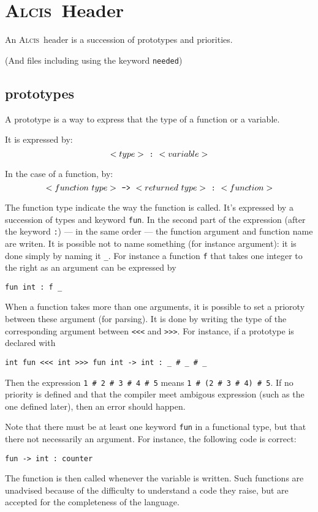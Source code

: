 \documentclass{article}
\newcommand{\Alcis}{\textsc{Alcis}~}
\begin{document}
\section{\Alcis Header}

An \Alcis header is a succession of prototypes and priorities.

(And files including using the keyword \texttt{needed})

\subsection{prototypes}

A prototype is a way to express that the type of a function or a variable.

It is expressed by:
\[
    <type>~\textrm{\tt:}~<variable>
\]

In the case of a function, by:
\[
    <function~type>~\textrm{\tt->}~<returned~type>~\textrm{\tt:}~<function>
\]

The function type indicate the way the function is called.
It’s expressed by a succession of types and keyword \lstinline$fun$.
In the second part of the expression (after the keyword \lstinline$:$) — in the same order — the function argument and function name are writen.
It is possible not to name something (for instance argument): it is done simply by naming it \texttt{\_}.
For instance a function \lstinline$f$ that takes one integer to the right as an argument can be expressed by
\begin{lstlisting}
fun int : f _
\end{lstlisting}

When a function takes more than one arguments, it is possible to set a prioroty between these argument (for parsing).
It is done by writing the type of the corresponding argument between \lstinline$<<<$ and \lstinline$>>>$.
For instance, if a prototype is declared with
\begin{lstlisting}
int fun <<< int >>> fun int -> int : _ # _ # _
\end{lstlisting}
Then the expression \lstinline$1 # 2 # 3 # 4 # 5$ means \lstinline$1 # (2 # 3 # 4) # 5$.
If no priority is defined and that the compiler meet ambigous expression (such as the one defined later), then an error should happen.

Note that there must be at least one keyword \lstinline$fun$ in a functional type, but that there not necessarily an argument.
For instance, the following code is correct:
\begin{lstlisting}
fun -> int : counter
\end{lstlisting}
The function is then called whenever the variable is written.
Such functions are unadvised because of the difficulty to understand a code they raise, but are accepted for the completeness of the language.
\end{document}
